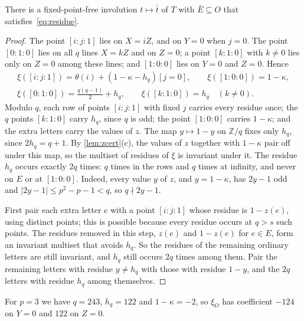 \documentclass[11pt]{article}
\theoremstyle{definition}
\theoremstyle{plain}
\newcommand{\Z}{\mathbb{Z}}
\begin{document}
\begin{lemma}\label{lem:pairing}
There is a fixed-point-free involution $t\mapsto\bar t$ of $T$ with $\bar E\subseteq O$ that satisfies~\eqref{eq:residue}.
\end{lemma}

\begin{proof}
The point $[i:j:1]$ lies on $X=iZ$, and on $Y=0$ when $j=0$. The point $[0:1:0]$ lies on all $q$ lines $X=kZ$ and on $Z=0$; a point $[k:1:0]$ with $k\neq0$ lies only on $Z=0$ among these lines; and $[1:0:0]$ lies on $Y=0$ and $Z=0$. Hence
\begin{gather*}
\xi([i:j:1])=\theta(i)+(1-\kappa-h_q)[j=0],\qquad \xi([1:0:0])=1-\kappa,\\
\xi([0:1:0])=\tfrac{q(q-1)}2+h_q,\qquad \xi([k:1:0])=h_q\quad(k\neq0).
\end{gather*}
Modulo $q$, each row of points $[i:j:1]$ with fixed $j$ carries every residue once; the $q$ points $[k:1:0]$ carry $h_q$, since $q$ is odd; the point $[1:0:0]$ carries $1-\kappa$; and the extra letters carry the values of $z$. The map $y\mapsto1-y$ on $\Z/q$ fixes only $h_q$, since $2h_q=q+1$. By \cref{lem:zcert}(c), the values of $z$ together with $1-\kappa$ pair off under this map, so the multiset of residues of $\xi$ is invariant under it. The residue $h_q$ occurs exactly $2q$ times: $q$ times in the rows and $q$ times at infinity, and never on $E$ or at $[1:0:0]$. Indeed, every value $y$ of $z$, and $y=1-\kappa$, has $2y-1$ odd and $|2y-1|\le p^2-p-1<q$, so $q\nmid 2y-1$.

First pair each extra letter $e$ with a point $[i:j:1]$ whose residue is $1-z(e)$, using distinct points; this is possible because every residue occurs at $q>s$ such points. The residues removed in this step, $z(e)$ and $1-z(e)$ for $e\in E$, form an invariant multiset that avoids $h_q$. So the residues of the remaining ordinary letters are still invariant, and $h_q$ still occurs $2q$ times among them. Pair the remaining letters with residue $y\neq h_q$ with those with residue $1-y$, and the $2q$ letters with residue $h_q$ among themselves.
\end{proof}

For $p=3$ we have $q=243$, $h_q=122$ and $1-\kappa=-2$, so $\xi_O$ has coefficient $-124$ on $Y=0$ and $122$ on $Z=0$.
\end{document}
